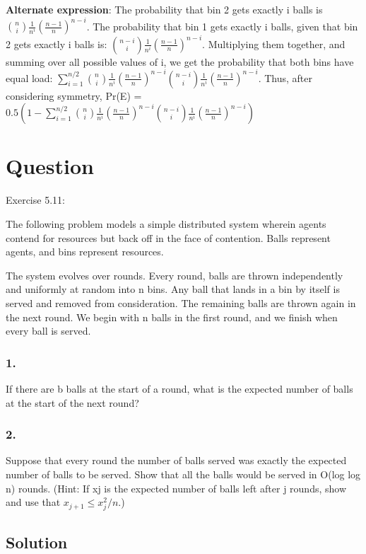 \documentclass[10pt]{article}
\begin{document}
\textbf{Alternate expression}: The probability that bin 2 gets exactly i balls is $\binom{n}{i}\frac{1}{n^{i}}(\frac{n-1}{n})^{n-i}$. The probability that bin 1 gets exactly i balls, given that bin 2 gets exactly i balls is: $\binom{n-i}{i}\frac{1}{n^{i}}(\frac{n-1}{n})^{n-i}$. Multiplying them together, and summing over all possible values of i, we get the probability that both bins have equal load: $\sum_{i=1}^{n/2}\binom{n}{i}\frac{1}{n^{i}}(\frac{n-1}{n})^{n-i}\binom{n-i}{i}\frac{1}{n^{i}}(\frac{n-1}{n})^{n-i}$. Thus, after considering symmetry, Pr(E) = $0.5(1-\sum_{i=1}^{n/2}\binom{n}{i}\frac{1}{n^{i}}(\frac{n-1}{n})^{n-i}\binom{n-i}{i}\frac{1}{n^{i}}(\frac{n-1}{n})^{n-i})$

\section{Question}

Exercise 5.11:

The following problem models a simple distributed system wherein agents contend for resources but back off in the face of contention. Balls represent agents, and bins represent resources.

The system evolves over rounds. Every round, balls are thrown independently and uniformly at random into n bins. Any ball that lands in a bin by itself is served and removed from consideration. The remaining balls are thrown again in the next round. We begin with n balls in the first round, and we finish when every ball is served.

\subsubsection{1.}
If there are b balls at the start of a round, what is the expected number of balls at the start of the next round?
\subsubsection{2.}
Suppose that every round the number of balls served was exactly the expected number of balls to be served. Show that all the balls would be served in O(log log n) rounds. (Hint: If xj is the expected number of balls left after j rounds, show and use that $x_{j+1}\leq x_{j}^{2}/n$.)


\subsection{Solution}
\end{document}
